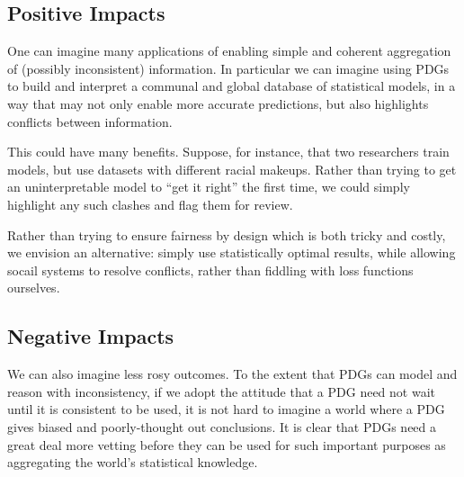 \documentclass{article}
\theoremstyle{plain}
\theoremstyle{definition}
\theoremstyle{remark}
\numberwithin{equation}{section}
\begin{document}
\subsection{Positive Impacts}
One can imagine many applications of enabling simple and coherent
aggregation of (possibly inconsistent) information. In particular we
can imagine using PDGs to build and interpret a communal and global
database of statistical models, in a way that may not only enable more
accurate predictions, but also highlights conflicts between
information.

This could have many benefits.
Suppose, for instance, that two researchers train models, but use
datasets with
different racial makeups. Rather than trying to get an uninterpretable
model to ``get it right'' the first time, we could simply highlight any
such clashes and flag them for review.

Rather than trying to
ensure fairness by design which is both tricky and costly,
we envision an alternative: simply use
statistically optimal results, while allowing socail systems to resolve conflicts,
rather than fiddling with loss functions ourselves.

\subsection{Negative Impacts}

We can also imagine less rosy outcomes. To the extent that PDGs can
model and reason with inconsistency,
if
we adopt the attitude that a PDG need not wait until it is consistent
to be used, it is not hard to imagine a world where a PDG gives biased and
poorly-thought out conclusions.
It is clear that PDGs need a great deal more
vetting before they can be used for such important purposes as
aggregating the world's statistical knowledge.
\end{document}
